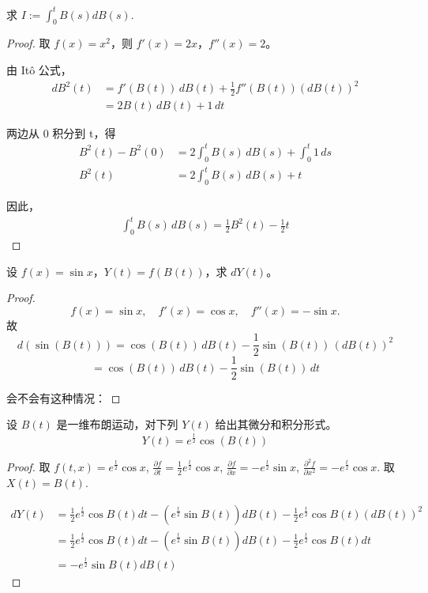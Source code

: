 \documentclass[lang=cn,10pt,thmcnt=section]{elegantbook}
\begin{document}
\begin{example}
	求 \( I := \int_0^t B(s) dB(s) \).
\end{example}
\begin{proof}
	取 \( f(x) = x^2 \)，则 \( f'(x) = 2x \)，\( f''(x) = 2 \)。

	由 Itô 公式，
	\begin{align*}
	dB^2(t) &= f'(B(t))\, dB(t) + \frac{1}{2} f''(B(t)) (dB(t))^2 \\
			&= 2B(t)\, dB(t) + 1\, dt
	\end{align*}
	
	两边从 0 积分到 t，得
	\begin{align*}
	B^2(t) - B^2(0) &= 2 \int_0^t B(s)\, dB(s) + \int_0^t 1\, ds \\
	B^2(t) &= 2 \int_0^t B(s)\, dB(s) + t
	\end{align*}
	
	因此，
	\begin{align*}
	\int_0^t B(s)\, dB(s) = \frac{1}{2} B^2(t) - \frac{1}{2} t
	\end{align*}
\end{proof}
\begin{example}
	设 \( f(x) = \sin x \)，\( Y(t) = f(B(t)) \)，求 \( dY(t) \)。
\end{example}
\begin{proof}
	\[
	f(x) = \sin x,\quad f'(x) = \cos x,\quad f''(x) = -\sin x.
	\]
	故
	\[
	d(\sin(B(t))) = \cos(B(t))\, dB(t) - \frac{1}{2} \sin(B(t))\, (dB(t))^2
	\]
	\[
	= \cos(B(t))\, dB(t) - \frac{1}{2} \sin(B(t))\, dt
	\]
	
	会不会有这种情况：
\end{proof}
\begin{example}
	设 \( B(t) \) 是一维布朗运动，对下列 \( Y(t) \) 给出其微分和积分形式。
\[
Y(t) = e^{\frac{t}{2} }\cos(B(t))
\]
\end{example}
\begin{proof}
	取 $f(t,x) = e^{\frac{t}{2}} \cos x$, $\frac{\partial f}{\partial t} = \frac{1}{2} e^{\frac{t}{2}} \cos x$, $\frac{\partial f}{\partial x} = -e^{\frac{t}{2}} \sin x$, 
	$\frac{\partial^2 f}{\partial x^2} = -e^{\frac{t}{2}} \cos x$. 取 $X(t) = B(t)$.
	
	\begin{align*}
	dY(t) &= \frac{1}{2} e^{\frac{t}{2}} \cos B(t) dt - \left(e^{\frac{t}{2}} \sin B(t)\right) dB(t) - \frac{1}{2} e^{\frac{t}{2}} \cos B(t) (dB(t))^2 \\
	&= \frac{1}{2} e^{\frac{t}{2}} \cos B(t) dt - \left(e^{\frac{t}{2}} \sin B(t)\right) dB(t) - \frac{1}{2} e^{\frac{t}{2}} \cos B(t) dt \\
	&= -e^{\frac{t}{2}} \sin B(t) dB(t)
	\end{align*}
\end{proof}
\end{document}
